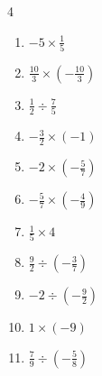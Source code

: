 \begin{multicols}{4}
\begin{enumerate}

  \item $\displaystyle -5\times{}\frac{1}{5}$

        \phantom{$\displaystyle =-1$}

  \item $\displaystyle \frac{10}{3}\times{}\left(-\frac{10}{3}\right)$


  \item $\displaystyle \frac{1}{2}\div{}\frac{7}{5}$


  \item $\displaystyle -\frac{3}{2}\times{}\left(-1\right)$


  \item $\displaystyle -2\times{}\left(-\frac{5}{7}\right)$


  \item $\displaystyle -\frac{5}{7}\times{}\left(-\frac{4}{9}\right)$


  \item $\displaystyle \frac{1}{5}\times{}4$


  \item $\displaystyle \frac{9}{2}\div{}\left(-\frac{3}{7}\right)$


\columnbreak %

  \item $\displaystyle -2\div{}\left(-\frac{9}{2}\right)$


  \item $\displaystyle 1\times{}\left(-9\right)$

        \phantom{$\displaystyle =-9$}

  \item $\displaystyle \frac{7}{9}\div{}\left(-\frac{5}{8}\right)$



\end{enumerate}
\end{multicols}

